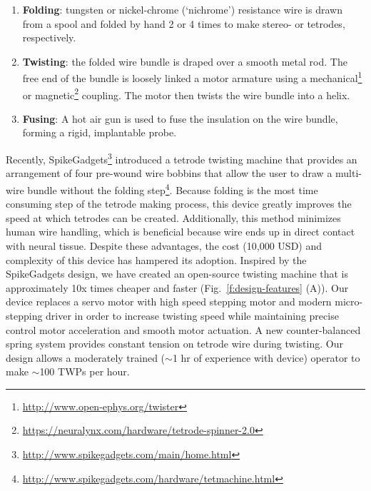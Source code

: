 \documentclass[11pt,a4paper]{article}
\begin{document}
\begin{enumerate}
    \item \textbf{Folding}: tungsten or nickel-chrome (`nichrome')
        resistance wire is drawn from a spool and folded by hand 2 or 4
        times to make stereo- or tetrodes, respectively.
    \item \textbf{Twisting}: the folded wire bundle is draped over a smooth
        metal rod. The free end of the bundle is loosely linked a motor
        armature using a mechanical\footnote{\url{http://www.open-ephys.org/twister}}
        or magnetic\footnote{\url{https://neuralynx.com/hardware/tetrode-spinner-2.0}}
        coupling.  The motor then twists the wire bundle into a helix.
    \item \textbf{Fusing}: A hot air gun is used to fuse the insulation
        on the wire bundle, forming a rigid, implantable probe.
\end{enumerate}

Recently,
SpikeGadgets\footnote{\url{http://www.spikegadgets.com/main/home.html}}
introduced a tetrode twisting machine that provides an arrangement of four
pre-wound wire bobbins that allow the user to draw a multi-wire bundle without
the folding
step\footnote{\url{http://www.spikegadgets.com/hardware/tetmachine.html}}.
Because folding is the most time consuming step of the tetrode making process,
this device greatly improves the speed at which tetrodes can be created.
Additionally, this method minimizes human wire handling, which is beneficial
because wire ends up in direct contact with neural tissue. Despite these
advantages, the cost (10,000 USD) and complexity of this device has hampered
its adoption. Inspired by the SpikeGadgets design, we have created an
open-source twisting machine that is approximately 10x times cheaper and faster
(Fig.~\ref{f:design-features} (A)). Our device replaces a servo motor with high
speed stepping motor and modern micro-stepping driver in order to increase
twisting speed while maintaining precise control motor acceleration and smooth
motor actuation. A new counter-balanced spring system provides constant tension
on tetrode wire during twisting. Our design allows a moderately trained
($\sim$1 hr of experience with device) operator to make $\sim$100 TWPs per
hour.
\end{document}
